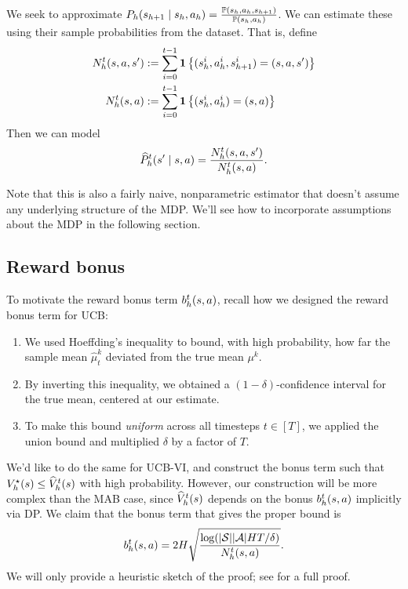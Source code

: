 \documentclass[\main/main]{subfiles}
\begin{document}
We seek to approximate $P_h(s_{h+1} \mid s_h, a_h) = \frac{\operatorname*{\mathbb{P}}(s_h, a_h, s_{h+1})}{\operatorname*{\mathbb{P}}(s_h, a_h)}$. We can estimate these using their sample probabilities from the dataset. That is, define
\begin{align*}
    N_h^t(s, a, s') & := \sum_{i=0}^{t-1} \mathbf{1}\left\{ (s_h^i, a_h^i, s_{h+1}^i) = (s, a, s') \right\} \\
    N_h^t(s, a)     & := \sum_{i=0}^{t-1} \mathbf{1}\left\{ (s_h^i, a_h^i) = (s, a) \right\}                \\
\end{align*}
Then we can model
\[
    \widehat{P}_h^t(s' \mid s, a) = \frac{N_h^t(s, a, s')}{N_h^t(s, a)}.
\]
\begin{remark}
    Note that this is also a fairly naive, nonparametric estimator that doesn't assume any underlying structure of the MDP. We'll see how to incorporate assumptions about the MDP in the following section.
\end{remark}


\subsection{Reward bonus}

To motivate the reward bonus term $b_h^t(s, a)$, recall how we designed the reward bonus term for UCB:
\begin{enumerate}
    \item  We used Hoeffding's inequality to bound, with high probability, how far the sample mean $\hat \mu_t^k$ deviated from the true mean $\mu^k$.
    \item By inverting this inequality, we obtained a $(1-\delta)$-confidence interval for the true mean,
          centered at our estimate.
    \item To make this bound \emph{uniform} across all timesteps $t \in [T]$,
          we applied the union bound and multiplied $\delta$ by a factor of $T$.
\end{enumerate}

We'd like to do the same for UCB-VI, and construct the bonus term such that $V^\star_h(s) \le \widehat{V}_h^t(s)$ with high probability.
However, our construction will be more complex than the MAB case, since $\widehat{V}_h^t(s)$ depends on the bonus $b_h^t(s, a)$ implicitly via DP.
We claim that the bonus term that gives the proper bound is
\begin{equation}
    b_h^t(s, a) = 2 H \sqrt{\frac{\log( |\mathcal{S}||\mathcal{A}|H T/\delta )}{N_h^t(s, a)}}.
    \label{eq:ucb_vi_bonus}
\end{equation}
We will only provide a heuristic sketch of the proof; see \cite[Section 7.3]{agarwal_reinforcement_2022} for a full proof.
\end{document}
